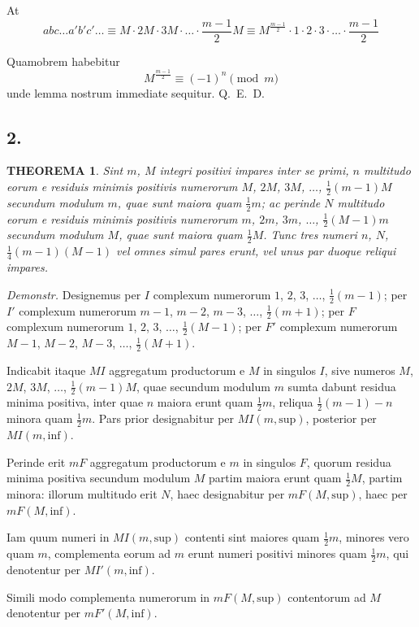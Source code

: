 \documentclass[12pt,a4paper]{article}
\theoremstyle{plain}
\newtheorem*{theorem}{THEOREMA}
\theoremstyle{definition}
\theoremstyle{remark}
\begin{document}
At
\[abc \ldots a'b'c' \ldots \equiv M \cdot 2M \cdot 3M \cdot \ldots \cdot \frac{m-1}{2}M \equiv M^{\frac{m-1}{2}} \cdot 1 \cdot 2 \cdot 3 \cdot \ldots \cdot \frac{m-1}{2}\]

Quamobrem habebitur
\[M^{\frac{m-1}{2}} \equiv (-1)^n \pmod{m}\]
unde lemma nostrum immediate sequitur. \hfill Q.~E.~D.

\subsection*{2.}
\begin{theorem}
Sint $m$, $M$ integri positivi impares inter se primi, $n$ multitudo eorum e residuis minimis positivis numerorum $M$, $2M$, $3M$, $\ldots$, $\frac{1}{2}(m-1)M$ secundum modulum $m$, quae sunt maiora quam $\frac{1}{2}m$; ac perinde $N$ multitudo eorum e residuis minimis positivis numerorum $m$, $2m$, $3m$, $\ldots$, $\frac{1}{2}(M-1)m$ secundum modulum $M$, quae sunt maiora quam $\frac{1}{2}M$. Tunc tres numeri $n$, $N$, $\frac{1}{4}(m-1)(M-1)$ vel omnes simul pares erunt, vel unus par duoque reliqui impares.
\end{theorem}

\textit{Demonstr.} Designemus per $I$ complexum numerorum $1$, $2$, $3$, $\ldots$, $\frac{1}{2}(m-1)$; per $I'$ complexum numerorum $m-1$, $m-2$, $m-3$, $\ldots$, $\frac{1}{2}(m+1)$; per $F$ complexum numerorum $1$, $2$, $3$, $\ldots$, $\frac{1}{2}(M-1)$; per $F'$ complexum numerorum $M-1$, $M-2$, $M-3$, $\ldots$, $\frac{1}{2}(M+1)$.

Indicabit itaque $MI$ aggregatum productorum e $M$ in singulos $I$, sive numeros $M$, $2M$, $3M$, $\ldots$, $\frac{1}{2}(m-1)M$, quae secundum modulum $m$ sumta dabunt residua minima positiva, inter quae $n$ maiora erunt quam $\frac{1}{2}m$, reliqua $\frac{1}{2}(m-1)-n$ minora quam $\frac{1}{2}m$. Pars prior designabitur per $MI(m,\text{sup})$, posterior per $MI(m,\text{inf})$.

Perinde erit $mF$ aggregatum productorum e $m$ in singulos $F$, quorum residua minima positiva secundum modulum $M$ partim maiora erunt quam $\frac{1}{2}M$, partim minora: illorum multitudo erit $N$, haec designabitur per $mF(M,\text{sup})$, haec per $mF(M,\text{inf})$.

Iam quum numeri in $MI(m,\text{sup})$ contenti sint maiores quam $\frac{1}{2}m$, minores vero quam $m$, complementa eorum ad $m$ erunt numeri positivi minores quam $\frac{1}{2}m$, qui denotentur per $MI'(m,\text{inf})$.

Simili modo complementa numerorum in $mF(M,\text{sup})$ contentorum ad $M$ denotentur per $mF'(M,\text{inf})$.
\end{document}
